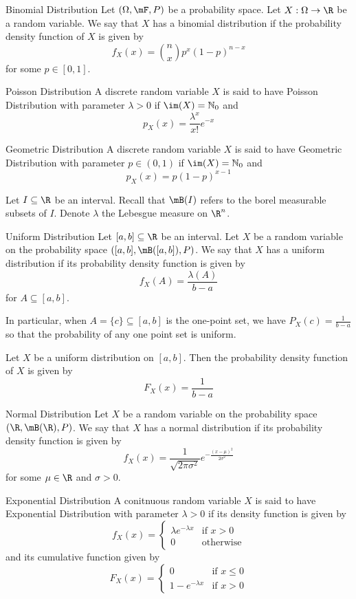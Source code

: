 \documentclass[a4paper]{article}
\begin{document}
\begin{eg}{Binomial Distribution}{} Let $(\Omega,\mF,P)$ be a probability space. Let $X:\Omega\to\R$ be a random variable. We say that $X$ has a binomial distribution if the probability density function of $X$ is given by $$f_X(x)=\binom{n}{x}p^x(1-p)^{n-x}$$ for some $p\in[0,1]$. 
\end{eg}

\begin{defn}{Poisson Distribution}{} A discrete random variable $X$ is said to have Poisson Distribution with parameter $\lambda>0$ if $\im(X)=\mathbb{N}_0$ and $$p_X(x)=\frac{\lambda^x}{x!}e^{-x}$$
\end{defn}

\begin{defn}{Geometric Distribution}{} A discrete random variable $X$ is said to have Geometric Distribution with parameter $p\in(0,1)$ if $\im(X)=\mathbb{N}_0$ and $$p_X(x)=p(1-p)^{x-1}$$
\end{defn}

Let $I\subseteq\R$ be an interval. Recall that $\mB(I)$ refers to the borel measurable subsets of $I$. Denote $\lambda$ the Lebesgue measure on $\R^n$. 

\begin{eg}{Uniform Distribution}{} Let $[a,b]\subseteq\R$ be an interval. Let $X$ be a random variable on the probability space $([a,b],\mB([a,b]),P)$. We say that $X$ has a uniform distribution if its probability density function is given by $$f_X(A)=\frac{\lambda(A)}{b-a}$$ for $A\subseteq[a,b]$.
\end{eg}

In particular, when $A=\{c\}\subseteq[a,b]$ is the one-point set, we have $P_X(c)=\frac{1}{b-a}$ so that the probability of any one point set is uniform. 

\begin{eg}{}{} Let $X$ be a uniform distribution on $[a,b]$. Then the probability density function of $X$ is given by $$F_X(x)=\frac{1}{b-a}$$
\end{eg}

\begin{eg}{Normal Distribution}{} Let $X$ be a random variable on the probability space $(\R,\mB(\R),P)$. We say that $X$ has a normal distribution if its probability density function is given by $$f_X(x)=\frac{1}{\sqrt{2\pi\sigma^2}}e^{-\frac{(x-\mu)^2}{2\sigma^2}}$$ for some $\mu\in\R$ and $\sigma>0$. 
\end{eg}

\begin{defn}{Exponential Distribution}{} A conitnuous random variable $X$ is said to have Exponential Distribution with parameter $\lambda>0$ if its density function is given by $$f_X(x)=\begin{cases}
\lambda e^{-\lambda x} & \text{if $x>0$}\\
0 & \text{otherwise}
\end{cases}$$ and its cumulative function given by $$F_X(x)=\begin{cases}
0 & \text{if $x\leq 0$}\\
1-e^{-\lambda x} & \text{if $x>0$}
\end{cases}$$
\end{defn}
\end{document}
